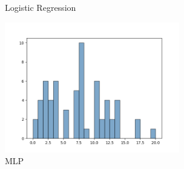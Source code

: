 \documentclass[UTF8,a4paper,10pt]{ctexart}
\begin{document}
\begin{itemize}
\begin{figure}[H]
\begin{minipage}[t]{0.5\linewidth}
\caption{Logistic Regression}
\label{fig:side:a}
\end{minipage}%
\begin{minipage}[t]{0.5\linewidth}
\centering
\includegraphics[width=3in]{output_mlp_hist.png}
\caption{MLP}
\label{fig:side:b}
\end{minipage}
\end{figure}


\end{itemize}
\end{document}
